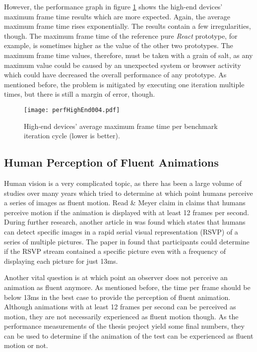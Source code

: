 However, the performance graph in figure \ref{fig:perfHighEnd004} shows the high-end devices' maximum frame time results which are more expected. Again, the average maximum frame time rises exponentially. The results contain a few irregularities, though. The maximum frame time of the reference pure \emph{React} prototype, for example, is sometimes higher as the value of the other two prototypes. The maximum frame time values, therefore, must be taken with a grain of salt, as any maximum value could be caused by an unexpected system or browser activity which could have decreased the overall performance of any prototype. As mentioned before, the problem is mitigated by executing one iteration multiple times, but there is still a margin of error, though.

\begin{figure}
\centering
\texttt{[image: perfHighEnd004.pdf]}
\caption{High-end devices' average maximum frame time per benchmark iteration cycle (lower is better).}
\label{fig:perfHighEnd004}
\end{figure}

\subsection{Human Perception of Fluent Animations}
\label{sub:humanPerception}


Human vision is a very complicated topic, as there has been a large volume of studies over many years which tried to determine at which point humans perceive a series of images as fluent motion. Read \& Meyer claim in \cite{RestorationOfMotionPictureFilm} claims that humans perceive motion if the animation is displayed with at least 12 frames per second. During further research, another article in \cite{Potter2014} was found which states that humans can detect specific images in a rapid serial visual representation (RSVP) of a series of multiple pictures. The paper in \cite{Potter2014} found that participants could determine if the RSVP stream contained a specific picture even with a frequency of displaying each picture for just 13ms. 

Another vital question is at which point an observer does not perceive an animation as fluent anymore. As mentioned before, the time per frame should be below 13ms in the best case to provide the perception of fluent animation. Although animations with at least 12 frames per second can be perceived as motion, they are not necessarily experienced as fluent motion though. As the performance measurements of the thesis project yield some final numbers, they can be used to determine if the animation of the test can be experienced as fluent motion or not.

